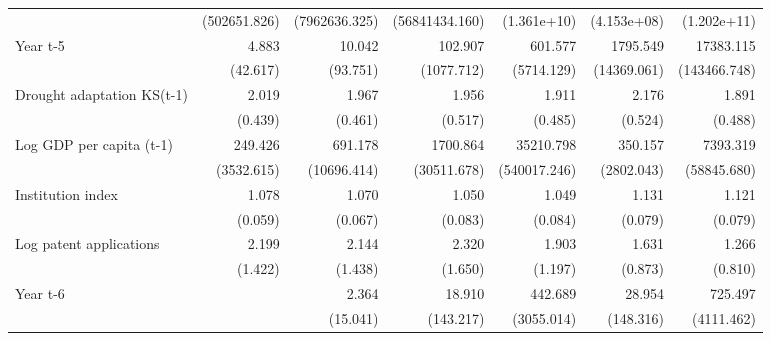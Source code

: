 \begin{table}[htbp]
\begin{tabular}{l*{6}{D{.}{.}{-1}}}
                    &(502651.826)         &(7962636.325)         &(56841434.160)         & (1.361e+10)         & (4.153e+08)         & (1.202e+11)         \\
\addlinespace
Year t-5            &       4.883         &      10.042         &     102.907         &     601.577         &    1795.549         &   17383.115         \\
                    &    (42.617)         &    (93.751)         &  (1077.712)         &  (5714.129)         & (14369.061)         &(143466.748)         \\
\addlinespace
Drought adaptation KS(t-1)&       2.019\sym{***}&       1.967\sym{***}&       1.956\sym{**} &       1.911\sym{**} &       2.176\sym{***}&       1.891\sym{**} \\
                    &     (0.439)         &     (0.461)         &     (0.517)         &     (0.485)         &     (0.524)         &     (0.488)         \\
\addlinespace
Log GDP per capita (t-1)&     249.426         &     691.178         &    1700.864         &   35210.798         &     350.157         &    7393.319         \\
                    &  (3532.615)         & (10696.414)         & (30511.678)         &(540017.246)         &  (2802.043)         & (58845.680)         \\
\addlinespace
Institution index   &       1.078         &       1.070         &       1.050         &       1.049         &       1.131\sym{*}  &       1.121\sym{\%}  \\
                    &     (0.059)         &     (0.067)         &     (0.083)         &     (0.084)         &     (0.079)         &     (0.079)         \\
\addlinespace
Log patent applications&       2.199         &       2.144         &       2.320         &       1.903         &       1.631         &       1.266         \\
                    &     (1.422)         &     (1.438)         &     (1.650)         &     (1.197)         &     (0.873)         &     (0.810)         \\
\addlinespace
Year t-6            &                     &       2.364         &      18.910         &     442.689         &      28.954         &     725.497         \\
                    &                     &    (15.041)         &   (143.217)         &  (3055.014)         &   (148.316)         &  (4111.462)         \\

\end{tabular}
\end{table}
